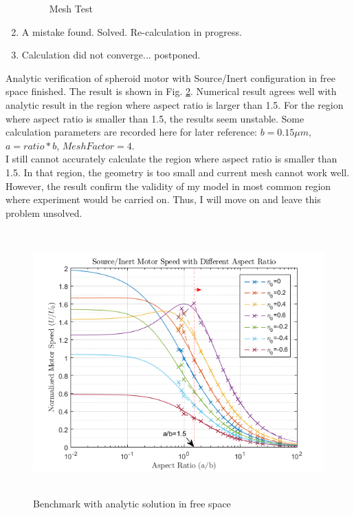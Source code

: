 \documentclass[fontsize=11pt, %
                             paper=a4, %
                             twoside, %
                             captions=tableheading,
                             index=totoc,
                             hyperref]{labbook}
\begin{document}
\begin{addmargin}[4cm]{0cm}
\begin{enumerate}
\begin{figure}
\caption{Mesh Test}\label{2016-11-21-MT}
\end{figure}
\item A mistake found. Solved. Re-calculation in progress.
\item Calculation did not converge... postponed.
\end{enumerate}

Analytic verification of spheroid motor with Source/Inert configuration in free space finished. The result is shown in Fig. \ref{2016-11-22-BWASIFS}. Numerical result agrees well with analytic result in the region where aspect ratio is larger than 1.5. For the region where aspect ratio is smaller than 1.5, the results seem unstable. Some calculation parameters are recorded here for later reference: $b=0.15 \mu m$, $a=ratio*b$, $MeshFactor=4$.\\
I still cannot accurately calculate the region where aspect ratio is smaller than 1.5. In that region, the geometry is too small and current mesh cannot work well. However, the result confirm the validity of my model in most common region where experiment would be carried on. Thus, I will move on and leave this problem unsolved.
\begin{figure}
\centering
\includegraphics[width=\linewidth, height=4in]{2016-11-22-AnalyticVerification_Free.png}
\caption{Benchmark with analytic solution in free space}\label{2016-11-22-BWASIFS}
\end{figure}


\end{addmargin}
\end{document}

